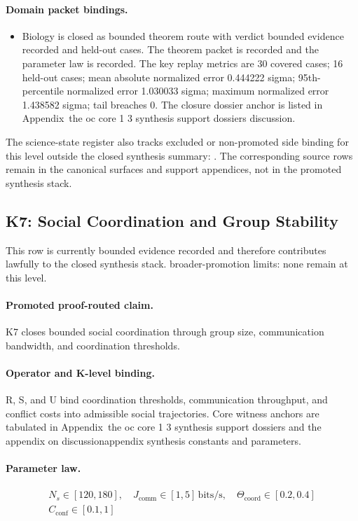 \paragraph{Domain packet bindings.}
\begin{itemize}[leftmargin=1.6em,nosep]
\item Biology is closed as bounded theorem route with verdict bounded evidence recorded and  held-out cases. The theorem packet is recorded and the parameter law is recorded. The key replay metrics are 30 covered cases; 16 held-out cases; mean absolute normalized error 0.444222 sigma; 95th-percentile normalized error 1.030033 sigma; maximum normalized error 1.438582 sigma; tail breaches 0. The closure dossier anchor is listed in Appendix~the oc core 1 3 synthesis support dossiers discussion.
\end{itemize}
The science-state register also tracks  excluded or non-promoted side binding for this level outside the closed synthesis summary: . The corresponding source rows remain in the canonical surfaces and support appendices, not in the promoted synthesis stack.

\subsection{K7: Social Coordination and Group Stability}
\label{sec:oc-core-1-3-synthesis-k7}
This row is currently bounded evidence recorded and therefore contributes lawfully to the closed synthesis stack.
broader-promotion limits: none remain at this level.

\paragraph{Promoted proof-routed claim.}
K7 closes bounded social coordination through group size, communication bandwidth, and coordination thresholds.

\paragraph{Operator and K-level binding.}
R, S, and U bind coordination thresholds, communication throughput, and conflict costs into admissible social trajectories.
Core witness anchors are tabulated in Appendix~the oc core 1 3 synthesis support dossiers and the appendix on discussionappendix synthesis constants and parameters.

\paragraph{Parameter law.}
\[
\begin{gathered} N_s \in [120,180],\quad J_{\mathrm{comm}} \in [1,5]\,\mathrm{bits/s},\quad \Theta_{\mathrm{coord}} \in [0.2,0.4] \\ C_{\mathrm{conf}} \in [0.1,1] \end{gathered}
\]

